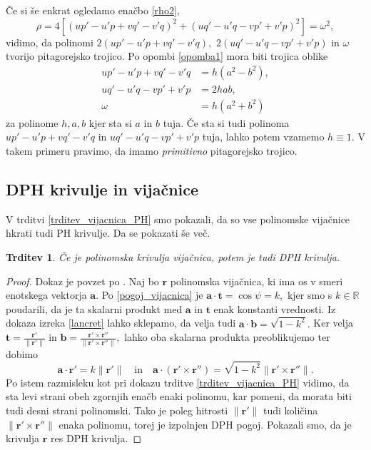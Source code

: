 \documentclass[12pt,a4paper,twoside]{article}
\theoremstyle{definition} %
\theoremstyle{plain} %
\newtheorem{trditev}[definicija]{Trditev}
\theoremstyle{primerstyle}
\numberwithin{equation}{section}  %
\newcommand{\R}{\mathbb R}
\newcommand{\binormala}{\frac{\mathbf{r}'\times\mathbf{r}''}{\lVert \mathbf{r}'\times\mathbf{r}'' \rVert}}
\newcommand{\tV}{\mathbf{t}}
\newcommand{\aV}{\mathbf{a}}
\newcommand{\bV}{\mathbf{b}}
\newcommand{\rV}{\mathbf{r}}
\newcommand{\ndr}{\lVert \mathbf{r}'\rVert} %
\newcommand{\ndrtddr}{\lVert \mathbf{r}'\times \mathbf{r}'' \rVert} %
\begin{document}
Če si še enkrat ogledamo enačbo \eqref{rho2},
\begin{equation}
	\label{rho_omega2}
	\rho=4[(up'-u'p+vq'-v'q)^2+(uq'-u'q-vp'+v'p)^2]=\omega^2,
\end{equation}
vidimo, da polinomi $2(up'-u'p+vq'-v'q),$ $2(uq'-u'q-vp'+v'p)$ in $\omega$ tvorijo pitagorejsko trojico. Po opombi \ref{opomba1} mora biti trojica oblike
\begin{align}
	up'-u'p+vq'-v'q&=h(a^2-b^2), \nonumber \\
	uq'-u'q-vp'+v'p&=2hab, \label{kubota} \\
	\omega&=h(a^2+b^2) \nonumber
\end{align}
za polinome $h,a,b$ kjer sta si $a$ in $b$ tuja. Če sta si tudi polinoma $up'-u'p+vq'-v'q$ in $uq'-u'q-vp'+v'p$ tuja, lahko potem vzamemo $h\equiv 1.$ V takem primeru pravimo, da imamo \emph{primitivno} pitagorejsko trojico.

\subsection{DPH krivulje in vijačnice}
\label{sec_DPH_in_vijacnice}

V trditvi \ref{trditev_vijacnica_PH} smo pokazali, da so vse polinomske vijačnice hkrati tudi PH krivulje. Da se pokazati še več.
\begin{trditev}
	\label{trditev_vijacnica_DPH}
	Če je polinomska krivulja vijačnica, potem je tudi DPH krivulja.
\end{trditev}
\begin{proof}
	Dokaz je povzet po \cite[str.\ 117]{beltranmonterde}. Naj bo $\rV$ polinomska vijačnica, ki ima os v smeri enotskega vektorja $\aV.$ Po \eqref{pogoj_vijacnica} je $\aV\cdot\tV=\cos \psi=k,$ kjer smo s $k \in \R$ poudarili, da je ta skalarni produkt med $\aV$ in $\tV$ enak konstanti vrednosti. Iz dokaza izreka \ref{lancret} lahko sklepamo, da velja tudi $\aV\cdot\bV=\sqrt{1-k^2}.$ Ker velja $\tV=\frac{\rV'}{\lVert \rV' \rVert}$ in $\bV=\binormala,$ lahko oba skalarna produkta preoblikujemo ter dobimo
	\begin{equation}
		\aV\cdot\rV'=k\ndr \quad \text{in} \quad \aV\cdot (\rV'\times\rV'')=\sqrt{1-k^2}\ndrtddr .
	\end{equation}
	Po istem razmisleku kot pri dokazu trditve \ref{trditev_vijacnica_PH} vidimo, da sta levi strani obeh zgornjih enačb enaki polinomu, kar pomeni, da morata biti tudi desni strani polinomski. Tako je poleg hitrosti $\ndr$ tudi količina $\ndrtddr$ enaka polinomu, torej je izpolnjen DPH pogoj. Pokazali smo, da je krivulja $\rV$ res DPH krivulja.
\end{proof}
\end{document}
